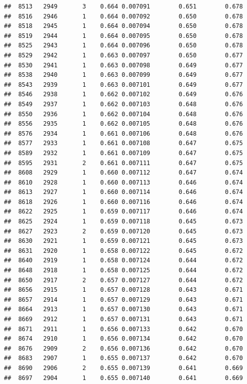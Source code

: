 \documentclass[
]{book}
\begin{document}
\begin{verbatim}
##  8513   2949       3    0.664 0.007091        0.651        0.678
##  8516   2946       1    0.664 0.007092        0.650        0.678
##  8518   2945       1    0.664 0.007094        0.650        0.678
##  8519   2944       1    0.664 0.007095        0.650        0.678
##  8525   2943       1    0.664 0.007096        0.650        0.678
##  8529   2942       1    0.663 0.007097        0.650        0.677
##  8530   2941       1    0.663 0.007098        0.649        0.677
##  8538   2940       1    0.663 0.007099        0.649        0.677
##  8543   2939       1    0.663 0.007101        0.649        0.677
##  8546   2938       1    0.662 0.007102        0.649        0.676
##  8549   2937       1    0.662 0.007103        0.648        0.676
##  8550   2936       1    0.662 0.007104        0.648        0.676
##  8556   2935       1    0.662 0.007105        0.648        0.676
##  8576   2934       1    0.661 0.007106        0.648        0.676
##  8577   2933       1    0.661 0.007108        0.647        0.675
##  8589   2932       1    0.661 0.007109        0.647        0.675
##  8595   2931       2    0.661 0.007111        0.647        0.675
##  8608   2929       1    0.660 0.007112        0.647        0.674
##  8610   2928       1    0.660 0.007113        0.646        0.674
##  8613   2927       1    0.660 0.007114        0.646        0.674
##  8618   2926       1    0.660 0.007116        0.646        0.674
##  8622   2925       1    0.659 0.007117        0.646        0.674
##  8625   2924       1    0.659 0.007118        0.645        0.673
##  8627   2923       2    0.659 0.007120        0.645        0.673
##  8630   2921       1    0.659 0.007121        0.645        0.673
##  8631   2920       1    0.658 0.007122        0.645        0.672
##  8640   2919       1    0.658 0.007124        0.644        0.672
##  8648   2918       1    0.658 0.007125        0.644        0.672
##  8650   2917       2    0.657 0.007127        0.644        0.672
##  8656   2915       1    0.657 0.007128        0.643        0.671
##  8657   2914       1    0.657 0.007129        0.643        0.671
##  8664   2913       1    0.657 0.007130        0.643        0.671
##  8669   2912       1    0.657 0.007131        0.643        0.671
##  8671   2911       1    0.656 0.007133        0.642        0.670
##  8674   2910       1    0.656 0.007134        0.642        0.670
##  8676   2909       2    0.656 0.007136        0.642        0.670
##  8683   2907       1    0.655 0.007137        0.642        0.670
##  8690   2906       2    0.655 0.007139        0.641        0.669
##  8697   2904       1    0.655 0.007140        0.641        0.669

\end{verbatim}
\end{document}
